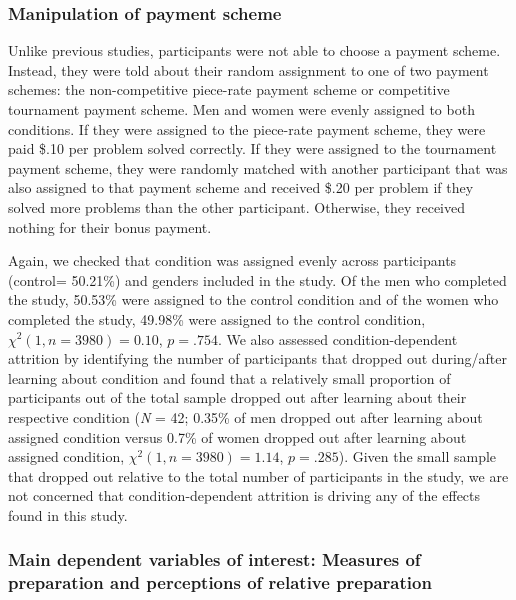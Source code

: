 \documentclass[letterpaper, nobind]{templates/ociamthesis}
\begin{document}
\hypertarget{manipulation-of-payment-scheme}{%
\subsubsection{Manipulation of payment scheme}\label{manipulation-of-payment-scheme}}

Unlike previous studies, participants were not able to choose a payment scheme. Instead, they were told about their random assignment to one of two payment schemes: the non-competitive piece-rate payment scheme or competitive tournament payment scheme. Men and women were evenly assigned to both conditions. If they were assigned to the piece-rate payment scheme, they were paid \$.10 per problem solved correctly. If they were assigned to the tournament payment scheme, they were randomly matched with another participant that was also assigned to that payment scheme and received \$.20 per problem if they solved more problems than the other participant. Otherwise, they received nothing for their bonus payment.

Again, we checked that condition was assigned evenly across participants (control= 50.21\%) and genders included in the study. Of the men who completed the study, 50.53\% were assigned to the control condition and of the women who completed the study, 49.98\% were assigned to the control condition, \(\chi^2(1, n = 3980) = 0.10\), \(p = .754\). We also assessed condition-dependent attrition by identifying the number of participants that dropped out during/after learning about condition and found that a relatively small proportion of participants out of the total sample dropped out after learning about their respective condition (\emph{N} = 42; 0.35\% of men dropped out after learning about assigned condition versus 0.7\% of women dropped out after learning about assigned condition, \(\chi^2(1, n = 3980) = 1.14\), \(p = .285\)). Given the small sample that dropped out relative to the total number of participants in the study, we are not concerned that condition-dependent attrition is driving any of the effects found in this study.

\hypertarget{main-dependent-variables-of-interest-measures-of-preparation-and-perceptions-of-relative-preparation}{%
\subsubsection{Main dependent variables of interest: Measures of preparation and perceptions of relative preparation}\label{main-dependent-variables-of-interest-measures-of-preparation-and-perceptions-of-relative-preparation}}
\end{document}

